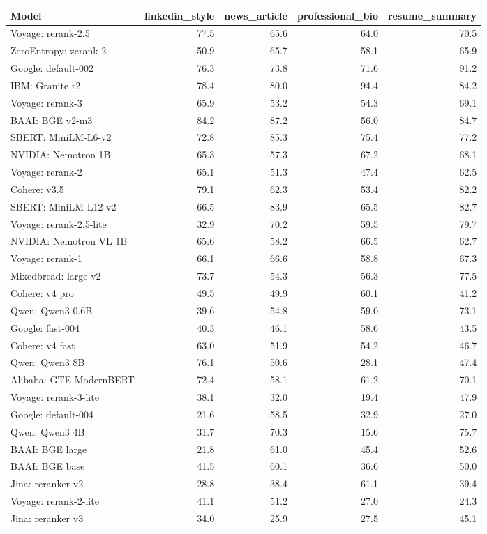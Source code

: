\begin{tabular}{lrrrr}
\toprule
Model & linkedin\_style & news\_article & professional\_bio & resume\_summary \\
\midrule
Voyage: rerank-2.5 & 77.5 & 65.6 & 64.0 & 70.5 \\
ZeroEntropy: zerank-2 & 50.9 & 65.7 & 58.1 & 65.9 \\
Google: default-002 & 76.3 & 73.8 & 71.6 & 91.2 \\
IBM: Granite r2 & 78.4 & 80.0 & 94.4 & 84.2 \\
Voyage: rerank-3 & 65.9 & 53.2 & 54.3 & 69.1 \\
BAAI: BGE v2-m3 & 84.2 & 87.2 & 56.0 & 84.7 \\
SBERT: MiniLM-L6-v2 & 72.8 & 85.3 & 75.4 & 77.2 \\
NVIDIA: Nemotron 1B & 65.3 & 57.3 & 67.2 & 68.1 \\
Voyage: rerank-2 & 65.1 & 51.3 & 47.4 & 62.5 \\
Cohere: v3.5 & 79.1 & 62.3 & 53.4 & 82.2 \\
SBERT: MiniLM-L12-v2 & 66.5 & 83.9 & 65.5 & 82.7 \\
Voyage: rerank-2.5-lite & 32.9 & 70.2 & 59.5 & 79.7 \\
NVIDIA: Nemotron VL 1B & 65.6 & 58.2 & 66.5 & 62.7 \\
Voyage: rerank-1 & 66.1 & 66.6 & 58.8 & 67.3 \\
Mixedbread: large v2 & 73.7 & 54.3 & 56.3 & 77.5 \\
Cohere: v4 pro & 49.5 & 49.9 & 60.1 & 41.2 \\
Qwen: Qwen3 0.6B & 39.6 & 54.8 & 59.0 & 73.1 \\
Google: fast-004 & 40.3 & 46.1 & 58.6 & 43.5 \\
Cohere: v4 fast & 63.0 & 51.9 & 54.2 & 46.7 \\
Qwen: Qwen3 8B & 76.1 & 50.6 & 28.1 & 47.4 \\
Alibaba: GTE ModernBERT & 72.4 & 58.1 & 61.2 & 70.1 \\
Voyage: rerank-3-lite & 38.1 & 32.0 & 19.4 & 47.9 \\
Google: default-004 & 21.6 & 58.5 & 32.9 & 27.0 \\
Qwen: Qwen3 4B & 31.7 & 70.3 & 15.6 & 75.7 \\
BAAI: BGE large & 21.8 & 61.0 & 45.4 & 52.6 \\
BAAI: BGE base & 41.5 & 60.1 & 36.6 & 50.0 \\
Jina: reranker v2 & 28.8 & 38.4 & 61.1 & 39.4 \\
Voyage: rerank-2-lite & 41.1 & 51.2 & 27.0 & 24.3 \\
Jina: reranker v3 & 34.0 & 25.9 & 27.5 & 45.1 \\
\bottomrule
\end{tabular}
